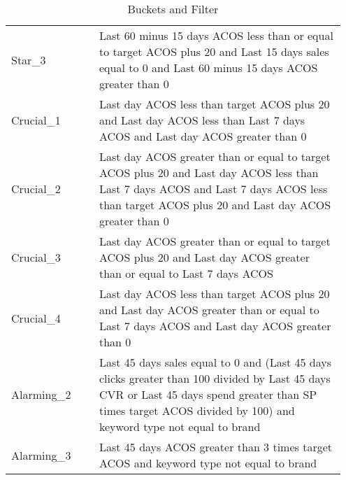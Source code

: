 \begin{table}[ht]
\begin{tabular}{|p{0.25\linewidth} | p{0.7\linewidth}|}
        Star\_3         & Last 60 minus 15 days ACOS less than or equal to target ACOS plus 20 and Last 15 days sales equal to 0 and Last 60 minus 15 days ACOS greater than 0                                                            \\
        Crucial\_1      & Last day ACOS less than target ACOS plus 20 and Last day ACOS less than Last 7 days ACOS and Last day ACOS greater than 0                                                                                       \\
        Crucial\_2      & Last day ACOS greater than or equal to target ACOS plus 20 and Last day ACOS less than Last 7 days ACOS and Last 7 days ACOS less than target ACOS plus 20 and Last day ACOS greater than 0                     \\
        Crucial\_3      & Last day ACOS greater than or equal to target ACOS plus 20 and Last day ACOS greater than or equal to Last 7 days ACOS                                                                                          \\
        Crucial\_4      & Last day ACOS less than target ACOS plus 20 and Last day ACOS greater than or equal to Last 7 days ACOS and Last day ACOS greater than 0                                                                        \\
        Alarming\_2     & Last 45 days sales equal to 0 and (Last 45 days clicks greater than 100 divided by Last 45 days CVR or Last 45 days spend greater than SP times target ACOS divided by 100) and keyword type not equal to brand \\
        Alarming\_3     & Last 45 days ACOS greater than 3 times target ACOS and keyword type not equal to brand                                                                                                                          \\
        \hline
    \end{tabular}
    \caption{Buckets and Filter}
    \label{tab:bucket_and_filter}
\end{table}


